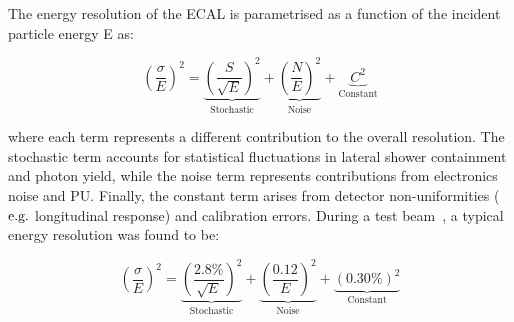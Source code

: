The energy resolution of the ECAL is parametrised as a function of the incident particle energy E as:

\begin{equation}
    \left(\frac{\sigma}{E}\right)^2 =  \underbrace{\left(\frac{S}{\sqrt{E}}\right)^2}_{\text{Stochastic}} +  \underbrace{\left(\frac{N}{E}\right)^2}_{\text{Noise}} +  \underbrace{C^2}_{\text{Constant}}
\end{equation}

where each term represents a different contribution to the overall resolution. The stochastic term accounts for statistical fluctuations in lateral shower containment and photon yield, while the noise term represents contributions from electronics noise and PU. Finally, the constant term arises from detector non-uniformities ($\mbox{e.g.}$ longitudinal response) and calibration errors. During a test beam~\cite{ECAL_TestBeam}, a typical energy resolution was found to be:

\begin{equation}
    \left(\frac{\sigma}{E}\right)^2 =  \underbrace{\left(\frac{2.8\%}{\sqrt{E}}\right)^2}_{\text{Stochastic}} +  \underbrace{\left(\frac{0.12}{E}\right)^2}_{\text{Noise}} +  \underbrace{(0.30\%)^2}_{\text{Constant}}
\end{equation}














